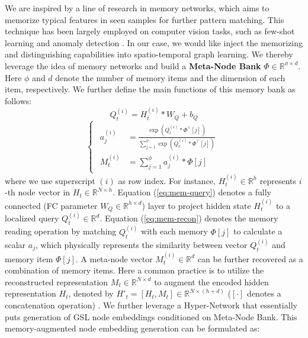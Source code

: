 \documentclass[letterpaper]{article} \usepackage{aaai23}  \usepackage{times}  \usepackage{helvet}  \usepackage{courier}  \usepackage[hyphens]{url}  \usepackage{graphicx} \urlstyle{rm} \def\UrlFont{\rm}  \usepackage{natbib}  \usepackage{caption} \usepackage{multirow}
\begin{document}
We are inspired by a line of research in memory networks, which aims to memorize typical features in seen samples for further pattern matching. This technique has been largely employed on computer vision tasks, such as few-shot learning \cite{vinyals2016matching, santoro2016meta} and anomaly detection \cite{gong2019memorizing, park2020learning}. In our case, we would like inject the memorizing and distinguishing capabilities into spatio-temporal graph learning. We thereby leverage the idea of memory networks and build a \textbf{Meta-Node Bank} $\Phi \in \mathbb{R}^{\phi \times d}$. Here $\phi$ and $d$ denote the number of memory items and the dimension of each item, respectively. We further define the main functions of this memory bank as follows:
\begin{equation} \label{eq:mem-query}
	Q_t^{(i)} = H_t^{(i)} * W_Q + b_Q
\end{equation}
\vspace{-0.3cm}
\begin{equation} \label{eq:mem-recon}
	\begin{cases}
	\begin{aligned}
		a_j^{(i)} & = \frac{\exp{(Q_t^{(i)} * \Phi^{\top}[j])}}{\sum_{j=1}^{\phi} \exp{(Q_t^{(i)} * \Phi^{\top}[j])}}     \\
		M_t^{(i)} & = \sum_{j=1}^{\phi} a_j^{(i)} * \Phi[j]
	\end{aligned}
	\end{cases}
\end{equation}
where we use superscript $(i)$ as row index. For instance, $H_t^{(i)} \in \mathbb{R}^h$ represents $i$-th node vector in $H_t \in \mathbb{R}^{N \times h}$. Equation (\ref{eq:mem-query}) denotes a fully connected (FC parameter $W_Q \in \mathbb{R}^{h \times d}$) layer to project hidden state $H_t^{(i)}$ to a localized query $Q_t^{(i)} \in \mathbb{R}^d$. Equation (\ref{eq:mem-recon}) denotes the memory reading operation by matching $Q_t^{(i)}$ with each memory $\Phi[j]$ to calculate a scalar $a_j$, which physically represents the similarity between vector $Q_t^{(i)}$ and memory item $\Phi[j]$. A meta-node vector $M_t^{(i)} \in \mathbb{R}^d$ can be further recovered as a combination of memory items. Here a common practice is to utilize the reconstructed representation $M_t \in \mathbb{R}^{N \times d}$ to augment the encoded hidden representation $H_t$, denoted by $H'_t = [H_t, M_t] \in \mathbb{R}^{N \times (h+d)}$ ($[\cdot]$ denotes a concatenation operation) \cite{yao2019learning, lee2021learning}. We further leverage a Hyper-Network \cite{ha2016hypernetworks} that essentially puts generation of GSL node embeddings conditioned on Meta-Node Bank. This memory-augmented node embedding generation can be formulated as:
\end{document}
